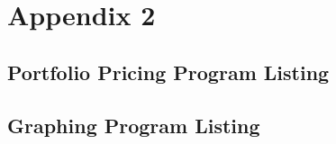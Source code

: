 \documentclass{article}
\begin{document}
\section*{Appendix 2}
\lstset{style=mystyle}
\subsection*{Portfolio Pricing Program Listing}

\subsection*{Graphing Program Listing}


\end{document}
